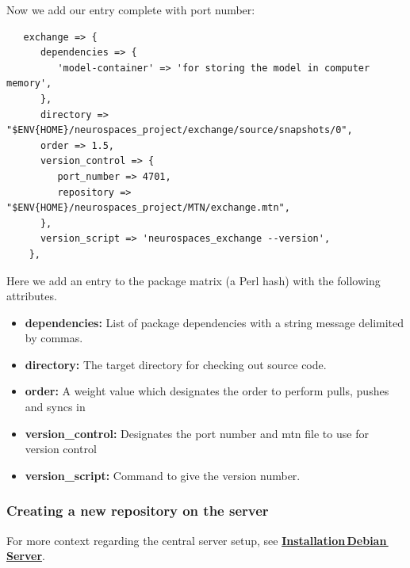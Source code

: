\documentclass[12pt]{article}
\begin{document}
Now we add our entry complete with port number:
\begin{verbatim}
   exchange => {
      dependencies => {
         'model-container' => 'for storing the model in computer memory',
      },
      directory => "$ENV{HOME}/neurospaces_project/exchange/source/snapshots/0",
      order => 1.5,
      version_control => {
         port_number => 4701,
         repository => "$ENV{HOME}/neurospaces_project/MTN/exchange.mtn",
      },
      version_script => 'neurospaces_exchange --version',
    },
\end{verbatim}
Here we add an entry to the package matrix (a Perl hash) with the following attributes.
\begin{itemize}
   \item {\bf dependencies:} List of package dependencies with a string message delimited by commas.
   \item {\bf directory:} The target directory for checking out source code.
   \item {\bf order:} A weight value which designates the order to perform pulls, pushes and syncs in
   \item {\bf version\_control:} Designates the port number and mtn file to use for version control
   \item {\bf version\_script:} Command to give the version number. 
\end{itemize}

\subsubsection*{Creating a new repository on the server}

For more context regarding the central server setup, see \href{../installation-debian-server/installation-debian-server.tex}{\bf Installation\,Debian\,Server}.
\end{document}
